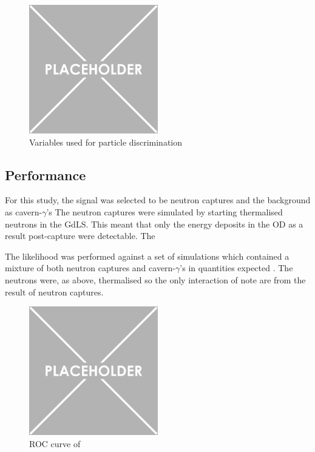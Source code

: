 \begin{figure}[!htbp]
    \centering
    \includegraphics[width=0.5\textwidth]{Figures/Placeholder.png}
    \caption{Variables used for particle discrimination}
    \label{fig:discrimination_variables}
\end{figure}



\subsection{Performance}
\par
For this study, the signal was selected to be neutron captures and the background as cavern-$\gamma$'s
The neutron captures were simulated by starting thermalised neutrons in the GdLS.
This meant that only the energy deposits in the OD as a result post-capture were detectable.
The 
\par
The likelihood was performed against a set of simulations which contained a mixture of both neutron captures and cavern-$\gamma$'s in quantities expected \cite{LZ_assay_ref}.
The neutrons were, as above, thermalised so the only interaction of note are from the result of neutron captures.






\begin{figure}[!htbp]
    \centering
    \includegraphics[width=0.5\textwidth]{Figures/Placeholder.png}
    \caption{ROC curve of}
    \label{fig:discrimination_performance}
\end{figure}

